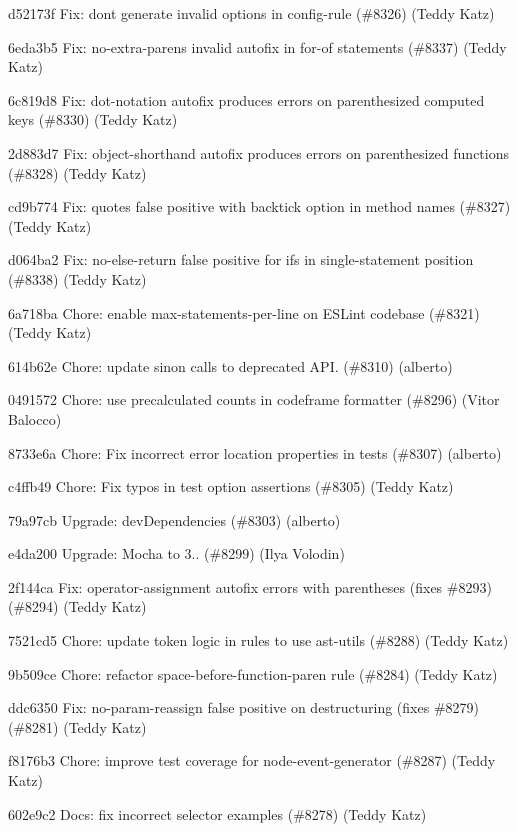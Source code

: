 \begin{DoxyItemize}
\item d52173f Fix\+: don\textquotesingle{}t generate invalid options in config-\/rule (\#8326) (Teddy Katz)
\item 6eda3b5 Fix\+: no-\/extra-\/parens invalid autofix in for-\/of statements (\#8337) (Teddy Katz)
\item 6c819d8 Fix\+: dot-\/notation autofix produces errors on parenthesized computed keys (\#8330) (Teddy Katz)
\item 2d883d7 Fix\+: object-\/shorthand autofix produces errors on parenthesized functions (\#8328) (Teddy Katz)
\item cd9b774 Fix\+: quotes false positive with backtick option in method names (\#8327) (Teddy Katz)
\item d064ba2 Fix\+: no-\/else-\/return false positive for ifs in single-\/statement position (\#8338) (Teddy Katz)
\item 6a718ba Chore\+: enable max-\/statements-\/per-\/line on ESLint codebase (\#8321) (Teddy Katz)
\item 614b62e Chore\+: update sinon calls to deprecated API. (\#8310) (alberto)
\item 0491572 Chore\+: use precalculated counts in codeframe formatter (\#8296) (Vitor Balocco)
\item 8733e6a Chore\+: Fix incorrect error location properties in tests (\#8307) (alberto)
\item c4ffb49 Chore\+: Fix typos in test option assertions (\#8305) (Teddy Katz)
\item 79a97cb Upgrade\+: dev\+Dependencies (\#8303) (alberto)
\item e4da200 Upgrade\+: Mocha to 3.. (\#8299) (Ilya Volodin)
\item 2f144ca Fix\+: operator-\/assignment autofix errors with parentheses (fixes \#8293) (\#8294) (Teddy Katz)
\item 7521cd5 Chore\+: update token logic in rules to use ast-\/utils (\#8288) (Teddy Katz)
\item 9b509ce Chore\+: refactor space-\/before-\/function-\/paren rule (\#8284) (Teddy Katz)
\item ddc6350 Fix\+: no-\/param-\/reassign false positive on destructuring (fixes \#8279) (\#8281) (Teddy Katz)
\item f8176b3 Chore\+: improve test coverage for node-\/event-\/generator (\#8287) (Teddy Katz)
\item 602e9c2 Docs\+: fix incorrect selector examples (\#8278) (Teddy Katz)
\end{DoxyItemize}

